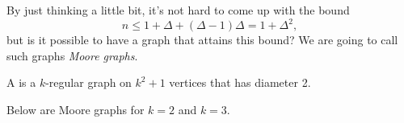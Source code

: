 \documentclass[a4paper]{scrartcl}
\begin{document}
By just thinking a little bit, it's not hard to come up with the bound
$$
n \leq 1 + \Delta + (\Delta - 1)\Delta = 1 + \Delta^2,
$$
but is it possible to have a graph that attains this bound? We are going to call such graphs \emph{Moore graphs}.

\begin{definition}
	A  is a $k$-regular graph on $k^2 + 1$ vertices that has diameter 2.
\end{definition}


\begin{example}
	Below are Moore graphs for $k = 2$ and $k = 3$.
	\begin{center}
		


\begin{tikzpicture}[x=0.75pt,y=0.75pt,yscale=-1,xscale=1]


\end{tikzpicture}
\end{center}
\end{example}
\end{document}

